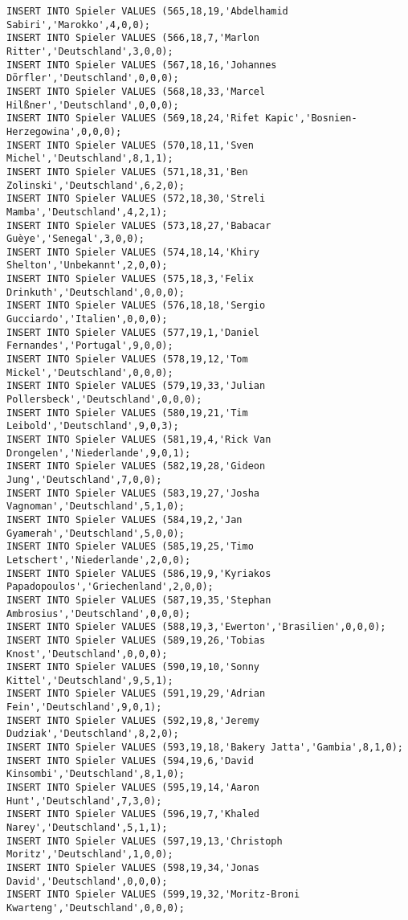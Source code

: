 \documentclass{lehramt-informatik-aufgabe}
\begin{document}
\begin{verbatim}
INSERT INTO Spieler VALUES (565,18,19,'Abdelhamid Sabiri','Marokko',4,0,0);
INSERT INTO Spieler VALUES (566,18,7,'Marlon Ritter','Deutschland',3,0,0);
INSERT INTO Spieler VALUES (567,18,16,'Johannes Dörfler','Deutschland',0,0,0);
INSERT INTO Spieler VALUES (568,18,33,'Marcel Hilßner','Deutschland',0,0,0);
INSERT INTO Spieler VALUES (569,18,24,'Rifet Kapic','Bosnien-Herzegowina',0,0,0);
INSERT INTO Spieler VALUES (570,18,11,'Sven Michel','Deutschland',8,1,1);
INSERT INTO Spieler VALUES (571,18,31,'Ben Zolinski','Deutschland',6,2,0);
INSERT INTO Spieler VALUES (572,18,30,'Streli Mamba','Deutschland',4,2,1);
INSERT INTO Spieler VALUES (573,18,27,'Babacar Guèye','Senegal',3,0,0);
INSERT INTO Spieler VALUES (574,18,14,'Khiry Shelton','Unbekannt',2,0,0);
INSERT INTO Spieler VALUES (575,18,3,'Felix Drinkuth','Deutschland',0,0,0);
INSERT INTO Spieler VALUES (576,18,18,'Sergio Gucciardo','Italien',0,0,0);
INSERT INTO Spieler VALUES (577,19,1,'Daniel Fernandes','Portugal',9,0,0);
INSERT INTO Spieler VALUES (578,19,12,'Tom Mickel','Deutschland',0,0,0);
INSERT INTO Spieler VALUES (579,19,33,'Julian Pollersbeck','Deutschland',0,0,0);
INSERT INTO Spieler VALUES (580,19,21,'Tim Leibold','Deutschland',9,0,3);
INSERT INTO Spieler VALUES (581,19,4,'Rick Van Drongelen','Niederlande',9,0,1);
INSERT INTO Spieler VALUES (582,19,28,'Gideon Jung','Deutschland',7,0,0);
INSERT INTO Spieler VALUES (583,19,27,'Josha Vagnoman','Deutschland',5,1,0);
INSERT INTO Spieler VALUES (584,19,2,'Jan Gyamerah','Deutschland',5,0,0);
INSERT INTO Spieler VALUES (585,19,25,'Timo Letschert','Niederlande',2,0,0);
INSERT INTO Spieler VALUES (586,19,9,'Kyriakos Papadopoulos','Griechenland',2,0,0);
INSERT INTO Spieler VALUES (587,19,35,'Stephan Ambrosius','Deutschland',0,0,0);
INSERT INTO Spieler VALUES (588,19,3,'Ewerton','Brasilien',0,0,0);
INSERT INTO Spieler VALUES (589,19,26,'Tobias Knost','Deutschland',0,0,0);
INSERT INTO Spieler VALUES (590,19,10,'Sonny Kittel','Deutschland',9,5,1);
INSERT INTO Spieler VALUES (591,19,29,'Adrian Fein','Deutschland',9,0,1);
INSERT INTO Spieler VALUES (592,19,8,'Jeremy Dudziak','Deutschland',8,2,0);
INSERT INTO Spieler VALUES (593,19,18,'Bakery Jatta','Gambia',8,1,0);
INSERT INTO Spieler VALUES (594,19,6,'David Kinsombi','Deutschland',8,1,0);
INSERT INTO Spieler VALUES (595,19,14,'Aaron Hunt','Deutschland',7,3,0);
INSERT INTO Spieler VALUES (596,19,7,'Khaled Narey','Deutschland',5,1,1);
INSERT INTO Spieler VALUES (597,19,13,'Christoph Moritz','Deutschland',1,0,0);
INSERT INTO Spieler VALUES (598,19,34,'Jonas David','Deutschland',0,0,0);
INSERT INTO Spieler VALUES (599,19,32,'Moritz-Broni Kwarteng','Deutschland',0,0,0);

\end{verbatim}
\end{document}
